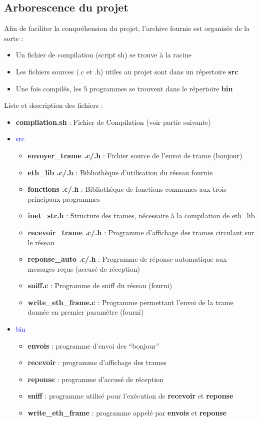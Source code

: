 \documentclass[a4paper,11pt]{article}
\begin{document}
	\subsection{Arborescence du projet}
	Afin de faciliter la compréhension du projet, l'archive fournie est organisée de la sorte :
	\begin{itemize}
	\item Un fichier de compilation (script sh) se trouve à la racine
	\item Les fichiers sources (.c et .h) utiles au projet sont dans un répertoire \textbf{src}
	\item Une fois compilés, les 5 programmes se trouvent dans le répertoire \textbf{bin}
	\end{itemize}
		\renewcommand{\labelitemii}{+}
	Liste et description des fichiers :
	\begin{itemize}
	\item \textbf{compilation.sh} : Fichier de Compilation (voir partie suivante)
	\item \textcolor{blue}{src}
		\begin{itemize}
		\item \textbf{envoyer\_trame .c/.h} : Fichier source de l'envoi de trame (bonjour)
		\item \textbf{eth\_lib .c/.h} : Bibliothèque d'utilisation du réseau fournie
		\item \textbf{fonctions .c/.h} : Bibliothèque de fonctions communes aux trois principaux programmes
		\item \textbf{inet\_str.h} : Structure des trames, nécessaire à la compilation de eth\_lib
		\item \textbf{recevoir\_trame .c/.h} : Programme d'affichage des trames circulant sur le réseau
		\item \textbf{reponse\_auto .c/.h} : Programme de réponse automatique aux messages reçus (accusé de réception)
		\item \textbf{sniff.c} : Programme de sniff du réseau (fourni)
		\item \textbf{write\_eth\_frame.c} : Programme permettant l'envoi de la trame donnée en premier paramètre (fourni)
		\end{itemize}
	\item \textcolor{blue}{bin}
		\begin{itemize}
		\item \textbf{envois} : programme d'envoi des ``bonjour''
		\item \textbf{recevoir} : programme d'affichage des trames
		\item \textbf{reponse} : programme d'accusé de réception
		\item \textbf{sniff} : programme utilisé pour l'exécution de \textbf{recevoir} et \textbf{reponse}
		\item \textbf{write\_eth\_frame} : programme appelé par \textbf{envois} et \textbf{reponse}
		\end{itemize}
	\end{itemize}
\end{document}
